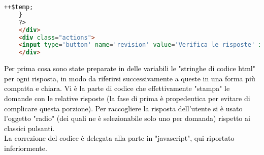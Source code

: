 \begin{lstlisting}[language=html]
		++$temp;
	}
	?>
	</div>
	<div class="actions">
	<input type='button' name='revision' value='Verifica le risposte' id='revision' onclick='check()'/>
	</div>
\end{lstlisting}

\raggedright
\textcolor{black}{Per prima cosa sono state preparate in delle variabili le "stringhe di codice html" per ogni risposta, in modo da riferirsi successivamente a queste in una forma più compatta e chiara. Vi è la parte di codice che effettivamente "stampa" le domande con le relative risposte (la fase di prima è propedeutica per evitare di complicare questa porzione). Per raccogliere la risposta dell'utente si è usato l'oggetto "radio" (dei quali ne è selezionabile solo uno per domanda) rispetto ai classici pulsanti.\\ 
La correzione del codice è delegata alla parte in "javascript", qui riportato inferiormente.}\\

